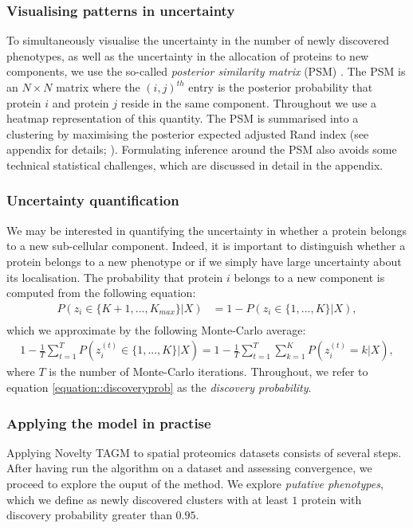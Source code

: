 \documentclass[12pt,english]{article}
\begin{document}
\subsubsection{Visualising patterns in uncertainty}
To simultaneously visualise the uncertainty in the number of newly discovered phenotypes, as well as the uncertainty in the allocation of proteins to new components, we use the so-called \textit{posterior similarity matrix} (PSM) \citep{fritsch::2009}. The PSM is an $N\times N$ matrix where the $(i,j)^{th}$ entry is the posterior probability that protein $i$ and protein $j$ reside in the same component. Throughout we use a heatmap representation of this quantity. The PSM is summarised into a clustering by maximising the posterior expected adjusted Rand index (see appendix for details; \citep{fritsch::2009}). Formulating inference around the PSM also avoids some technical statistical challenges, which are discussed in detail in the appendix.

\subsubsection{Uncertainty quantification}
We may be interested in quantifying the uncertainty in whether a protein belongs to a new sub-cellular component. Indeed, it is important to distinguish whether a protein belongs to a new phenotype or if we simply have large uncertainty about its localisation. The probability that protein $i$ belongs to a new component is computed from the following equation:
\begin{align}
P(z_i \in \{K + 1,..., K_{max}\}|X) & = 1 - P(z_i \in \{1,..., K\}|X), \\ 
\end{align}
which we approximate by the following Monte-Carlo average:
\begin{align}\label{equation::discoveryprob}
1 - \frac{1}{T} \sum_{t = 1}^{T}P(z^{(t)}_i \in \{1,..., K\}|X)= 1 - \frac{1}{T} \sum_{t = 1}^{T} \sum_{k=1}^KP(z^{(t)}_i = k|X),
\end{align}
where $T$ is the number of Monte-Carlo iterations. Throughout, we refer to equation \ref{equation::discoveryprob} as the \textit{discovery probability}.
\subsubsection{Applying the model in practise}
Applying Novelty TAGM to spatial proteomics datasets consists of several steps. After having run the algorithm on a dataset and assessing convergence, we proceed to explore the ouput of the method. We explore \textit{putative phenotypes}, which we define as newly discovered clusters with at least $1$ protein with discovery probability greater than $0.95$.
\end{document}
